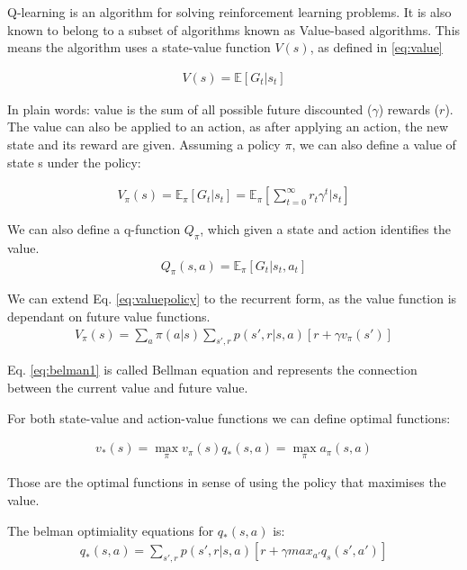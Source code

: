 Q-learning is an algorithm for solving reinforcement learning problems.
It is also known to belong to a subset of algorithms known as Value-based algorithms.
This means the algorithm uses a state-value function $V(s)$, as defined in \ref{eq:value}

\begin{align}
  V(s) = \mathbb{E} \left[  G_{t} \bigg| s_{t} \right]
  \label{eq:value}
\end{align}

In plain words: value is the sum of all possible future discounted ($\gamma$) rewards ($r$).
The value can also be applied to an action, as after applying an action, the new state and its reward are given.
Assuming a policy $\pi$, we can also define a value of state s under the policy:

\begin{align}
  V_{\pi}(s) = \mathbb{E}_{\pi} \left[  G_{t} \bigg| s_{t} \right]=\mathbb{E}_{\pi} \left[  \sum_{t=0}^{\infty} r_{t}\gamma^{t} | s_{t} \right]
  \label{eq:valuepolicy}
\end{align}

We can also define a q-function $Q_{\pi}$, which given a state and action identifies the value.
\begin{align}
  Q_{\pi}(s,a) = \mathbb{E}_{\pi} \left[  G_{t} \bigg| s_{t}, a_{t} \right]
  \end{align}

We can extend Eq. \ref{eq:valuepolicy} to the recurrent form, as the value function is dependant on future value functions.
\begin{align}
V_{\pi}(s) = \sum_{a}\pi(a|s)\sum_{s',r}p(s',r|s,a)\left[r+ \gamma v_{\pi}(s')\right]
\label{eq:belman1}
\end{align}

Eq. \ref{eq:belman1} is called Bellman equation and represents the connection between the current value and future value.

For both state-value and action-value functions we can define optimal functions:

\begin{align}
v_{*}(s) = \max_{\pi}v_{\pi}(s)
q_{*}(s,a) = \max_{\pi}a_{\pi}(s,a)
\label{eq:belman2}
\end{align}

Those are the optimal functions in sense of using the policy that maximises the value.

The belman optimiality equations for $q_{*}(s,a)$ is:
\begin{align}
q_{*}(s,a) = \sum_{s',r}p(s',r|s,a)\left[r+ \gamma max_{a'}q_{s}(s',a')\right]
\label{eq:belman3}
\end{align}

